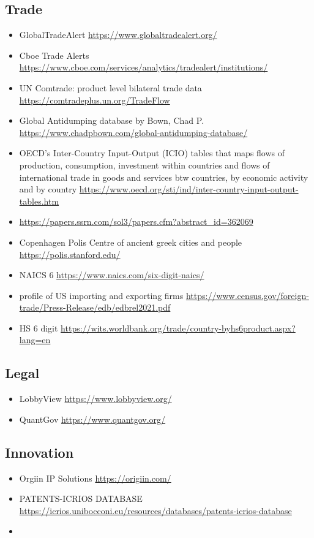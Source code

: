 \documentclass[10pt]{article} %
\begin{document}
    \subsection{Trade}
        \begin{itemize}
            \item GlobalTradeAlert \url{https://www.globaltradealert.org/}
            \item Cboe Trade Alerts \url{https://www.cboe.com/services/analytics/tradealert/institutions/}
            \item UN Comtrade: product level bilateral trade data \url{https://comtradeplus.un.org/TradeFlow}
            \item Global Antidumping database by Bown, Chad P. \url{https://www.chadpbown.com/global-antidumping-database/}
            \item OECD's Inter-Country Input-Output (ICIO) tables that maps flows of production, consumption, investment within countries and flows of international trade in goods and services btw countries, by economic activity and by country \url{https://www.oecd.org/sti/ind/inter-country-input-output-tables.htm}
            \item \cite{FeenstraRomalisSchott2002} \url{https://papers.ssrn.com/sol3/papers.cfm?abstract_id=362069}
            \item Copenhagen Polis Centre of ancient greek cities and people \url{https://polis.stanford.edu/}
            \item NAICS 6 \url{https://www.naics.com/six-digit-naics/}
            \item profile of US importing and exporting firms \url{https://www.census.gov/foreign-trade/Press-Release/edb/edbrel2021.pdf}
            \item HS 6 digit \url{https://wits.worldbank.org/trade/country-byhs6product.aspx?lang=en}
        \end{itemize}

    \subsection{Legal}
        \begin{itemize}
        \item LobbyView \url{https://www.lobbyview.org/}
        \item QuantGov \url{https://www.quantgov.org/}
        \end{itemize}
    
    \subsection{Innovation}
        \begin{itemize}
            \item Orgiin IP Solutions \url{https://origiin.com/}
            \item PATENTS-ICRIOS DATABASE \url{https://icrios.unibocconi.eu/resources/databases/patents-icrios-database}
            \item 
        \end{itemize}
    
\end{document}
